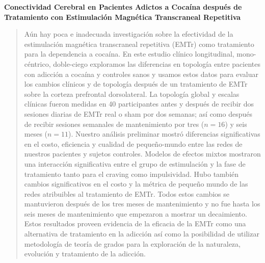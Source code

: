 \begin{center}
    \large\textbf{Conectividad Cerebral en Pacientes Adictos a Cocaína después de
     Tratamiento con Estimulación Magnética Transcraneal Repetitiva}
\end{center}
\begin{quotation}
    \noindent
Aún hay poca e inadecuada investigación sobre la efectividad de la estimulación magnética transcraneal repetitiva (EMTr) como tratamiento para la dependencia a cocaína. En este estudio clínico longitudinal, mono-céntrico, doble-ciego exploramos las diferencias en topología entre pacientes con adicción a cocaína y controles sanos y usamos estos datos para evaluar los cambios clínicos y de topología después de un tratamiento de EMTr sobre la corteza prefrontal dorsolateral. La topología global y escalas clínicas fueron medidas en 40 participantes antes y después de recibir dos sesiones diarias de EMTr real o sham por dos semanas; así como después de recibir sesiones semanales de mantenimiento por tres ($n=16$) y seis meses ($n=11$). Nuestro análisis preliminar mostró diferencias significativas en el costo, eficiencia y cualidad de pequeño-mundo entre las redes de nuestros pacientes y sujetos controles. Modelos de efectos mixtos mostraron una interacción significativa entre el grupo de estimulación y la fase de tratamiento tanto para el craving como impulsividad. Hubo también cambios significativos en el costo y la métrica de pequeño mundo de las redes atribuibles al tratamiento de EMTr. Todos estos cambios se mantuvieron después de los tres meses de mantenimiento y no fue hasta los seis meses de mantenimiento que empezaron a mostrar un decaimiento. Estos resultados proveen evidencia de la eficacia de la EMTr como una alternativa de tratamiento en la adicción así como la posibilidad de utilizar metodología de teoría de grados para la exploración de la naturaleza, evolución y tratamiento de la adicción.
\end{quotation}
\clearpage
